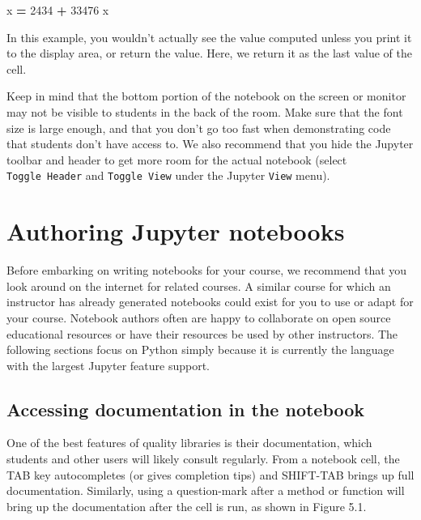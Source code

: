 \documentclass[]{book}
\newenvironment{Shaded}{\begin{snugshade}}{\end{snugshade}}
\newcommand{\DecValTok}[1]{\textcolor[rgb]{0.00,0.00,0.81}{#1}}
\newcommand{\NormalTok}[1]{#1}
\newcommand{\OperatorTok}[1]{\textcolor[rgb]{0.81,0.36,0.00}{\textbf{#1}}}
\let\BeginKnitrBlock\begin \let\EndKnitrBlock\end
\begin{document}
\begin{Shaded}
\begin{Highlighting}[]
\NormalTok{x }\OperatorTok{=} \DecValTok{2434} \OperatorTok{+} \DecValTok{33476}
\NormalTok{x}
\end{Highlighting}
\end{Shaded}

In this example, you wouldn't actually see the value computed unless
you print it to the display area, or return the value. Here, we return
it as the last value of the cell.

\BeginKnitrBlock{rmdimportant}
Keep in mind that the bottom portion of the notebook on the screen or
monitor may not be visible to students in the back of the room. Make
sure that the font size is large enough, and that you don't go too fast
when demonstrating code that students don't have access to. We also
recommend that you hide the Jupyter toolbar and header to get more
room for the actual notebook (select \texttt{Toggle\ Header} and \texttt{Toggle\ View}
under the Jupyter \texttt{View} menu).
\EndKnitrBlock{rmdimportant}

\hypertarget{authoring-jupyter-notebooks}{%
\section{Authoring Jupyter notebooks}\label{authoring-jupyter-notebooks}}

Before embarking on writing notebooks for your course, we recommend
that you look around on the internet for related courses.
A similar course for which an instructor has already generated
notebooks could exist for you to use or adapt for your course.
Notebook authors often are happy to collaborate on open source
educational resources or have their resources be used by other
instructors. The following sections focus on Python
simply because it is currently the language with the largest Jupyter
feature support.

\hypertarget{accessing-documentation-in-the-notebook}{%
\subsection{Accessing documentation in the notebook}\label{accessing-documentation-in-the-notebook}}

One of the best features of quality libraries is their documentation,
which students and other users will likely consult regularly. From a
notebook cell, the TAB key autocompletes (or gives completion tips)
and SHIFT-TAB brings up full documentation. Similarly, using a
question-mark after a method or function will bring up the
documentation after the cell is run, as shown in Figure 5.1.
\end{document}
